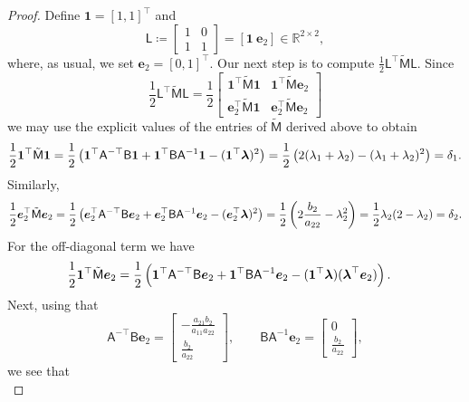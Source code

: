 \documentclass{amsart}
\newcommand{\bflambda}{\mbox{\boldmath$\lambda$}}
\newcommand{\Real}{\mathbb{R}}
\newcommand{\msfA}{\mathsf{A}}
\newcommand{\msfB}{\mathsf{B}}
\newcommand{\msfM}{\mathsf{M}}
\newcommand{\msfL}{\mathsf{L}}
\newcommand{\bfone }{\mathbf{1}}
\newcommand{\bfe}{\boldsymbol{e}}
\theoremstyle{definition}
\begin{document}
\begin{proof}
  Define $\bfone = [1, 1]^\top$ and
  \begin{equation*}
    \msfL \coloneqq
    \begin{bmatrix}
      1 & 0 \\
      1 & 1
    \end{bmatrix}
    =
    \left[ \bfone \ \bfe_2 \right] \in \Real^{2 \times 2},
  \end{equation*}
  where, as usual, we set $\bfe_2 = [0, 1]^\top$. Our next step is to compute $\frac{1}{2} \msfL^\top \tilde{\msfM} \msfL$. Since
  \begin{equation*}
    \frac{1}{2} \msfL^\top \tilde{\msfM} \msfL = \frac{1}{2}
    \begin{bmatrix}
      \bfone^\top \tilde{\msfM} \bfone & \bfone^\top \tilde{\msfM} \bfe_2 \\
      \bfe_2^\top \tilde{\msfM} \bfone & \bfe_2^\top \tilde{\msfM} \bfe_2
    \end{bmatrix}
  \end{equation*}
  we may use the explicit values of the entries of $\tilde{\msfM}$ derived above to obtain
  \[
    \frac{1}{2} \bfone^\top \tilde{\msfM} \bfone = \frac{1}{2} \left( \bfone^\top \msfA^{-\top}\msfB \bfone + \bfone^\top \msfB\msfA^{-1} \bfone - (\bfone^\top \bflambda)^2 \right) 
    = \frac{1}{2} \left( 2(\lambda_1 + \lambda_2) - (\lambda_1 + \lambda_2)^2 \right) = \delta_1.
  \]
  Similarly,
  \[
    \frac{1}{2} \bfe_2^\top \tilde{\msfM} \bfe_2 = \frac{1}{2} \left( \bfe_2^\top \msfA^{-\top}\msfB \bfe_2 + \bfe_2^\top \msfB \msfA^{-1} \bfe_2 - (\bfe_2^\top \bflambda)^2 \right) 
    = \frac{1}{2} \left( 2 \frac{b_2}{a_{22}} - \lambda_2^2 \right) = \frac{1}{2} \lambda_2(2 - \lambda_2) = \delta_2.
  \]
  For the off-diagonal term we have
  \begin{align*}
    \frac{1}{2} \bfone^\top \tilde{\msfM} \bfe_2 &= \frac{1}{2} \left( \bfone^\top \msfA^{-\top} \msfB \bfe_2 + \bfone^\top \msfB \msfA^{-1} \bfe_2 - (\bfone^\top \bflambda)(\bflambda^\top \bfe_2) \right).
  \end{align*}
  Next, using that
  \[
    \msfA^{-\top}\msfB \bfe_2 = \begin{bmatrix} -\frac{a_{21}b_2}{a_{11}a_{22}} \\ \frac{b_2}{a_{22}} \end{bmatrix},
    \qquad
    \msfB \msfA^{-1} \bfe_2 = \begin{bmatrix} 0 \\ \frac{b_2}{a_{22}} \end{bmatrix},
  \]
  we see that
  \[
\]
\end{proof}
\end{document}

